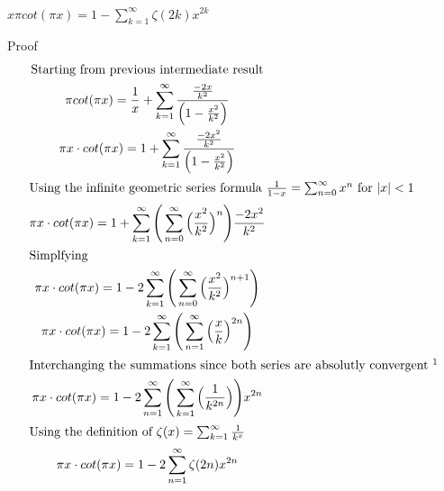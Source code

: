 \documentclass[a4paper]{article}
\begin{document}
\begin{theorem} \label{cot series zeta}
$\boxed{x \pi cot(\pi x) = 1 - \sum_{k=1}^{\infty} \zeta(2k) x^{2k} 
}$

Proof\\
\begin{gather*}
\text{Starting from previous intermediate result}
\\
\pi cot(\pi x) = \frac{1}{x} + \sum_{k=1}^{\infty} \frac{\frac{-2x}{k^2}}{\Big( 1-\frac{x^2}{k^2} \Big)} 
\\
\pi x \cdot cot(\pi x) = 1 + \sum_{k=1}^{\infty} \frac{\frac{-2x^2}{k^2}}{\Big( 1-\frac{x^2}{k^2} \Big)} 
\\
\intertext{Using the infinite geometric series formula $\frac{1}{1-x} = \sum_{n=0}^{\infty} x^n $ for $|x| < 1$}
\pi x \cdot cot(\pi x) = 1 + \sum_{k=1}^{\infty} \Bigg( \sum_{n=0}^{\infty} \Big( \frac{x^2}{k^2} \Big)^n \Bigg) \frac{-2x^2}{k^2}  
\\
\intertext{Simplfying}
\pi x \cdot cot(\pi x) = 1 - 2 \sum_{k=1}^{\infty} \Bigg( \sum_{n=0}^{\infty} \Big( \frac{x^2}{k^2} \Big)^{n+1} \Bigg)
\\
\pi x \cdot cot(\pi x) = 1 - 2 \sum_{k=1}^{\infty} \Bigg( \sum_{n=1}^{\infty} \Big( \frac{x}{k} \Big)^{2n} \Bigg)
\\
\intertext{Interchanging the summations since both series are absolutly convergent \footnotemark}
\pi x \cdot cot(\pi x) = 1 - 2 \sum_{n=1}^{\infty} \Bigg( \sum_{k=1}^{\infty} \Big( \frac{1}{k^{2n}} \Big) \Bigg) x^{2n}
\\
\intertext{Using the definition of $\zeta(x) = \sum_{k=1}^{\infty} \frac{1}{k^x}$}
\pi x \cdot cot(\pi x) = 1 - 2 \sum_{n=1}^{\infty} \zeta(2n) x^{2n}
\end{gather*}
\end{theorem}

\end{document}
